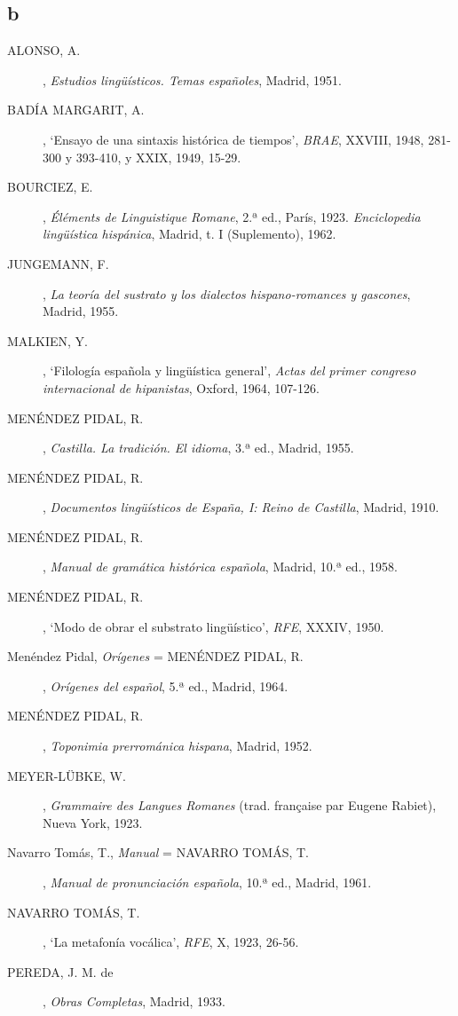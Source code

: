 \documentclass[11pt,spanish,b5paper]{book}
\begin{document}
\subsection{b} \begin{description}
\item[ALONSO, A.], \textit{Estudios lingüísticos. Temas españoles}, Madrid, 1951.
\item[BADÍA MARGARIT, A.], `Ensayo de una sintaxis histórica de tiempos', \textit{BRAE}, XXVIII, 1948, 281-300 y 393-410, y XXIX, 1949, 15-29.
\item[BOURCIEZ, E.], \textit{Éléments de Linguistique Romane}, 2.ª ed., París, 1923. \textit{Enciclopedia lingüística hispánica}, Madrid, t. I (Suplemento), 1962.
\item[JUNGEMANN, F.], \textit{La teoría del sustrato y los dialectos hispano-romances y gascones}, Madrid, 1955.
\item[MALKIEN, Y.], `Filología española y lingüística general', \textit{Actas del primer congreso internacional de hipanistas}, Oxford, 1964, 107-126.
\item[MENÉNDEZ PIDAL, R.], \textit{Castilla. La tradición. El idioma}, 3.ª ed., Madrid, 1955.
\item[MENÉNDEZ PIDAL, R.], \textit{Documentos lingüísticos de España, I: Reino de Castilla}, Madrid, 1910.
\item[MENÉNDEZ PIDAL, R.], \textit{Manual de gramática histórica española}, Madrid, 10.ª ed., 1958.
\item[MENÉNDEZ PIDAL, R.], `Modo de obrar el substrato lingüístico', \textit{RFE},  XXXIV, 1950.
\item[Menéndez Pidal, \textit{Orígenes} = MENÉNDEZ PIDAL, R.], \textit{Orígenes del español},  5.ª ed., Madrid, 1964.
\item[MENÉNDEZ PIDAL, R.], \textit{Toponimia prerrománica hispana}, Madrid, 1952.
\item[MEYER-LÜBKE, W.], \textit{Grammaire des Langues Romanes} (trad. française par Eugene Rabiet), Nueva York, 1923.
\item[Navarro Tomás, T., \textit{Manual} = NAVARRO TOMÁS, T.], \textit{Manual de pronunciación española}, 10.ª ed., Madrid, 1961.
\item[NAVARRO TOMÁS, T.], `La metafonía vocálica', \textit{RFE}, X, 1923, 26-56.
\item[PEREDA, J. M. de], \textit{Obras Completas}, Madrid, 1933.
\end{description}

\tableofcontents
\end{document}
